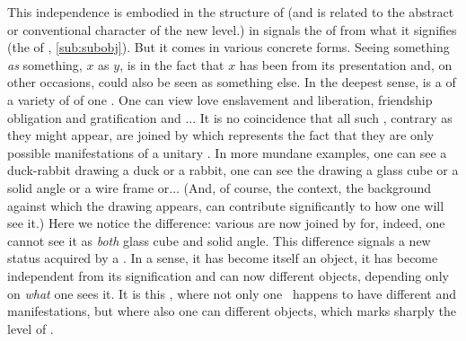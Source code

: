 This independence is embodied in the structure of  (and is related to
the abstract or conventional character of the new level.)  in  signals the  of  from what it signifies
(the  of , \ref{sub:subobj}). But it comes in various
concrete forms. Seeing something {\em as} something, $x$ as $y$, is 
in the fact that $x$ has been  from its  presentation
and, on other occasions, could also be seen as something else.  In the deepest
sense,  is a  of a variety of  of one
\nexus. One can view love  enslavement and  liberation,
friendship  obligation and  gratification and ...  It is
no coincidence that all such , contrary as they might appear, are
joined by  which represents the fact that they are only possible
 manifestations of a unitary \nexus. In more mundane examples, one can
see a duck-rabbit drawing  a duck or  a
rabbit, one can see the
drawing\raisebox{1.2ex}{\cube{0.8cm}} 
 a glass cube or  a solid angle or  a wire frame or...
(And, of course, the context, the background against which the drawing appears,
can contribute significantly to how one will see it.)  Here we notice the
difference: various  are now joined by  for, indeed, one 
cannot see it as {\em both} glass cube and solid angle. This difference signals
a new status acquired by a . In a sense, it has become itself an
object, it has become independent from its signification and can now
 different objects, depending only on  {\em what} one sees 
it. It is this , where not only one \nexus\ happens to have
different  and  manifestations, but where also one
 can  different objects, which marks sharply the level of
.

